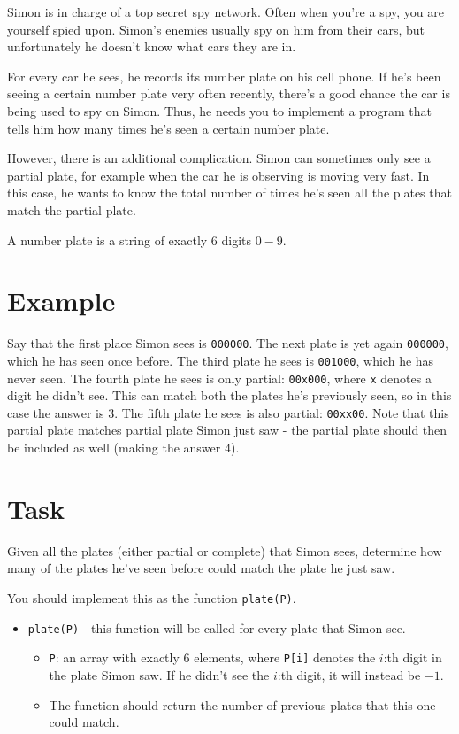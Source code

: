 \newcommand\version{v1}
Simon is in charge of a top secret spy network.
Often when you're a spy, you are yourself spied upon.
Simon's enemies usually spy on him from their cars, but unfortunately he doesn't know what cars they are in.

For every car he sees, he records its number plate on his cell phone.
If he's been seeing a certain number plate very often recently, there's a good chance the car is being used to spy on Simon.
Thus, he needs you to implement a program that tells him how many times he's seen a certain number plate.

However, there is an additional complication.
Simon can sometimes only see a partial plate, for example when the car he is observing is moving very fast.
In this case, he wants to know the total number of times he's seen all the plates that match the partial plate.

A number plate is a string of exactly 6 digits $0-9$.

\section*{Example}
Say that the first place Simon sees is \texttt{000000}.
The next plate is yet again \texttt{000000}, which he has seen once before.
The third plate he sees is \texttt{001000}, which he has never seen.
The fourth plate he sees is only partial: \texttt{00x000}, where \texttt{x} denotes a digit he didn't see.
This can match both the plates he's previously seen, so in this case the answer is $3$.
The fifth plate he sees is also partial: \texttt{00xx00}.
Note that this partial plate matches partial plate Simon just saw - the partial plate should then be included as well (making the answer $4$).

\section*{Task}
Given all the plates (either partial or complete) that Simon sees, determine how many of the
plates he've seen before could match the plate he just saw.

You should implement this as the function \texttt{plate(P)}.
\begin{itemize}
  \item \texttt{plate(P)} - this function will be called for every plate that Simon see.
  \begin{itemize}
    \item \texttt{P}: an array with exactly 6 elements, where \texttt{P[i]} denotes the $i$:th digit in the plate Simon saw.
      If he didn't see the $i$:th digit, it will instead be $-1$.
    \item The function should return the number of previous plates that this one could match.
  \end{itemize}
\end{itemize}

